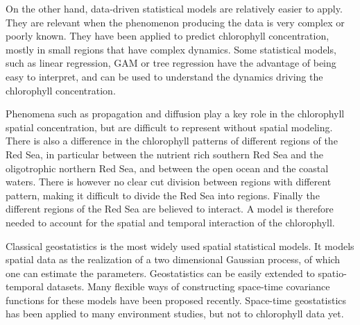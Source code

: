 On the other hand, data-driven statistical models are relatively easier to apply. They are relevant when the phenomenon producing the data is very complex or poorly known. They have been applied to predict chlorophyll concentration, mostly in small regions that have complex dynamics. Some statistical models, such as linear regression, GAM or tree regression have the advantage of being easy to interpret, and can be used to understand the dynamics driving the chlorophyll concentration.

Phenomena such as propagation and diffusion play a key role in the chlorophyll spatial concentration, but are difficult to represent without spatial modeling. There is also a difference in the chlorophyll patterns of different regions of the Red Sea, in particular between the nutrient rich southern Red Sea and the oligotrophic northern Red Sea, and between the open ocean and the coastal waters. There is however no clear cut division between regions with different pattern, making it difficult to divide the Red Sea into regions. Finally the different regions of the Red Sea are believed to interact. A model is therefore needed to account for the spatial and temporal interaction of the chlorophyll.

Classical geostatistics is the most widely used spatial statistical models. It models spatial data as the realization of a two dimensional Gaussian process, of which one can estimate the parameters. Geostatistics can be easily extended to spatio-temporal datasets. Many flexible ways of constructing space-time covariance functions for these models have been proposed recently. Space-time geostatistics has been applied to many environment studies, but not to chlorophyll data yet.

